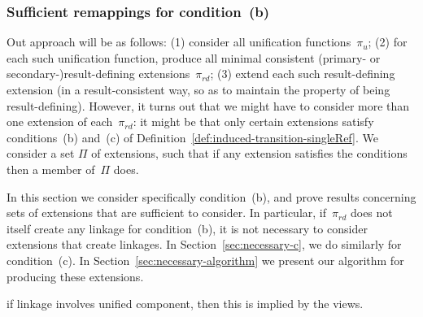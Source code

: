 \subsubsection{Sufficient remappings for condition~(b)}
\label{sec:necessary-b}

Out approach will be as follows: (1) consider all
unification functions~$\pi_u$; (2) for each such unification function, produce
all minimal consistent (primary- or secondary-)result-defining
extensions~$\pi_{rd}$; (3) extend each such result-defining extension (in a
result-consistent way, so as to maintain the property of being
result-defining).  However, it turns out that we might have to consider more
than one extension of each~$\pi_{rd}$: it might be that only certain
extensions satisfy conditions~(b) and~(c) of
Definition~\ref{def:induced-transition-singleRef}.  We consider a set $\Pi$ of
extensions, such that if any extension satisfies the conditions then a member
of~$\Pi$ does.

In this section we consider specifically condition~(b), and prove results
concerning sets of extensions that are sufficient to consider.  In particular,
if~$\pi_{rd}$ does not itself create any linkage for condition~(b), it is not
necessary to consider extensions that create linkages.  In
Section~\ref{sec:necessary-c}, we do similarly for condition~(c).  In
Section~\ref{sec:necessary-algorithm} we present our algorithm for producing
these extensions.


 if linkage involves unified component, then this is implied by
the views.



